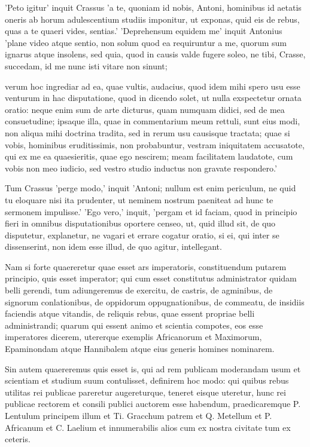  'Peto igitur' inquit Crassus 'a te, quoniam id nobis, Antoni, hominibus id aetatis oneris ab horum adulescentium studiis imponitur, ut exponas, quid eis de rebus, quas a te quaeri vides, sentias.' 'Deprehensum equidem me' inquit Antonius 'plane video atque sentio, non solum quod ea requiruntur a me, quorum sum ignarus atque insolens, sed quia, quod in causis valde fugere soleo, ne tibi, Crasse, succedam, id me nunc isti vitare non sinunt;

 verum hoc ingrediar ad ea, quae vultis, audacius, quod idem mihi spero usu esse venturum in hac disputatione, quod in dicendo solet, ut nulla exspectetur ornata oratio: neque enim sum de arte dicturus, quam numquam didici, sed de mea consuetudine; ipsaque illa, quae in commentarium meum rettuli, sunt eius modi, non aliqua mihi doctrina tradita, sed in rerum usu causisque tractata; quae si vobis, hominibus eruditissimis, non probabuntur, vestram iniquitatem accusatote, qui ex me ea quaesieritis, quae ego nescirem; meam facilitatem laudatote, cum vobis non meo iudicio, sed vestro studio inductus non gravate respondero.'

 Tum Crassus 'perge modo,' inquit 'Antoni; nullum est enim periculum, ne quid tu eloquare nisi ita prudenter, ut neminem nostrum paeniteat ad hunc te sermonem impulisse.' 'Ego vero,' inquit, 'pergam et id faciam, quod in principio fieri in omnibus disputationibus oportere censeo, ut, quid illud sit, de quo disputetur, explanetur, ne vagari et errare cogatur oratio, si ei, qui inter se dissenserint, non idem esse illud, de quo agitur, intellegant.

 Nam si forte quaereretur quae esset ars imperatoris, constituendum putarem principio, quis esset imperator; qui cum esset constitutus administrator quidam belli gerendi, tum adiungeremus de exercitu, de castris, de agminibus, de signorum conlationibus, de oppidorum oppugnationibus, de commeatu, de insidiis faciendis atque vitandis, de reliquis rebus, quae essent propriae belli administrandi; quarum qui essent animo et scientia compotes, eos esse imperatores dicerem, utererque exemplis Africanorum et Maximorum, Epaminondam atque Hannibalem atque eius generis homines nominarem.

 Sin autem quaereremus quis esset is, qui ad rem publicam moderandam usum et scientiam et studium suum contulisset, definirem hoc modo: qui quibus rebus utilitas rei publicae pareretur augereturque, teneret eisque uteretur, hunc rei publicae rectorem et consili publici auctorem esse habendum, praedicaremque P. Lentulum principem illum et Ti. Gracchum patrem et Q. Metellum et P. Africanum et C. Laelium et innumerabilis alios cum ex nostra civitate tum ex ceteris.


